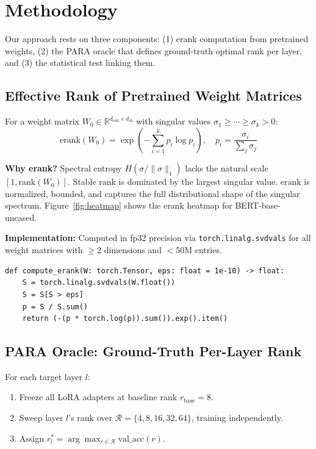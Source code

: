 \section{Methodology}
\label{sec:methodology}

Our approach rests on three components: (1) erank computation from pretrained weights, (2) the PARA oracle that defines ground-truth optimal rank per layer, and (3) the statistical test linking them.

\subsection{Effective Rank of Pretrained Weight Matrices}

For a weight matrix $W_0 \in \mathbb{R}^{d_{\text{out}} \times d_{\text{in}}}$ with singular values $\sigma_1 \geq \cdots \geq \sigma_k > 0$:
\begin{equation}
  \text{erank}(W_0) = \exp\!\left(-\sum_{i=1}^{k} p_i \log p_i\right), \quad p_i = \frac{\sigma_i}{\sum_j \sigma_j}
  \label{eq:erank}
\end{equation}

\textbf{Why erank?} Spectral entropy $H(\sigma/\|\sigma\|_1)$ lacks the natural scale $[1, \text{rank}(W_0)]$. Stable rank is dominated by the largest singular value. erank is normalized, bounded, and captures the full distributional shape of the singular spectrum. Figure~\ref{fig:heatmap} shows the erank heatmap for BERT-base-uncased.

\textbf{Implementation:} Computed in fp32 precision via \texttt{torch.linalg.svdvals} for all weight matrices with $\geq 2$ dimensions and $< 50$M entries.

\begin{verbatim}
def compute_erank(W: torch.Tensor, eps: float = 1e-10) -> float:
    S = torch.linalg.svdvals(W.float())
    S = S[S > eps]
    p = S / S.sum()
    return (-(p * torch.log(p)).sum()).exp().item()
\end{verbatim}

\subsection{PARA Oracle: Ground-Truth Per-Layer Rank}

For each target layer $l$:
\begin{enumerate}
  \item Freeze all LoRA adapters at baseline rank $r_{\text{base}} = 8$.
  \item Sweep layer $l$'s rank over $\mathcal{R} = \{4, 8, 16, 32, 64\}$, training independently.
  \item Assign $r_l^* = \arg\max_{r \in \mathcal{R}} \text{val\_acc}(r)$.
\end{enumerate}

